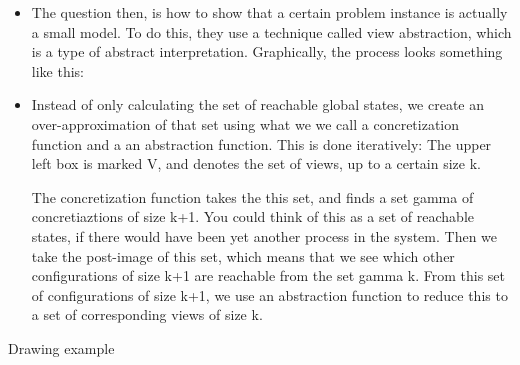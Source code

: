 \documentclass[handout]{beamer}
\begin{document}
\begin{footnotesize}
\begin{frame}
\begin{itemize}
\item
The question then, is how to show that a certain problem instance is actually a small model. To do this, they use a technique called view abstraction, which is a type of abstract interpretation. Graphically, the process looks something like this:
\item
Instead of only calculating the set of reachable global states, we create an over-approximation of that set using what we we call a concretization function and a an abstraction function. This is done iteratively: The upper left box is marked V, and denotes the set of views, up to a certain size k.

The concretization function takes the this set, and finds a set gamma of concretiaztions of size k+1. You could think of this as a set of reachable states, if there would have been yet another process in the system. Then we take the post-image of this set, which means that we see which other configurations of size k+1 are reachable from the set gamma k. From this set of configurations of size k+1, we use an abstraction function to reduce this to a set of corresponding views of size k.

\end{itemize}
\end{frame}

\begin{frame}
Drawing example
\end{frame}


\end{footnotesize}
\end{document}
